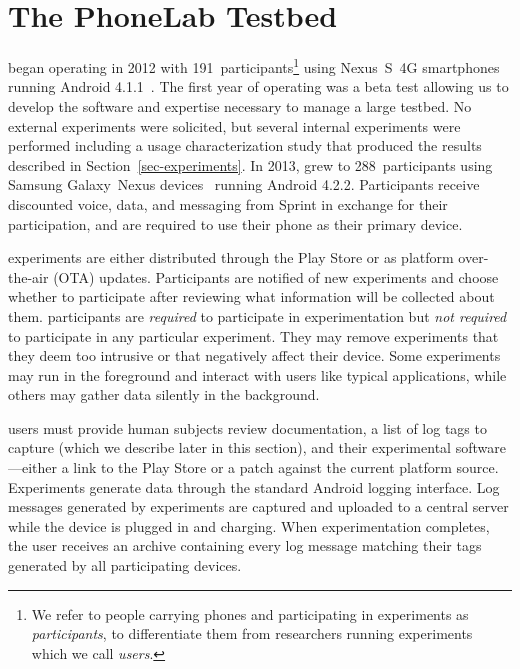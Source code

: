 

\section{The PhoneLab Testbed}
\label{sec-testbed}

\PhoneLab{} began operating in 2012 with 191~participants\footnote{We refer
to people carrying \PhoneLab{} phones and participating in experiments as
\PhoneLab{} \textit{participants}, to differentiate them from researchers
running \PhoneLab{} experiments which we call \textit{users}.} using
Nexus~S~4G smartphones~\cite{nexuss4g} running Android
4.1.1~\cite{jellybean}. The first year of operating was a beta test allowing
us to develop the software and expertise necessary to manage a large testbed.
No external experiments were solicited, but several internal experiments were
performed including a usage characterization study that produced the results
described in Section~\ref{sec-experiments}. In 2013, \PhoneLab{} grew to
288~participants using Samsung Galaxy~Nexus devices~\cite{nexuss4g} running
Android 4.2.2. Participants receive discounted voice, data, and messaging
from Sprint in exchange for their participation, and are required to use
their \PhoneLab{} phone as their primary device.

\PhoneLab{} experiments are either distributed through the Play Store or as
platform over-the-air (OTA) updates. Participants are notified of new
experiments and choose whether to participate after reviewing what
information will be collected about them. \PhoneLab{} participants are
\textit{required} to participate in experimentation but \textit{not required}
to participate in any particular experiment. They may remove experiments that
they deem too intrusive or that negatively affect their device. Some
experiments may run in the foreground and interact with users like typical
applications, while others may gather data silently in the background.

\PhoneLab{} users must provide human subjects review documentation, a list of
log tags to capture (which we describe later in this section), and their
experimental software---either a link to the Play Store or a patch against
the current \PhoneLab{} platform source.  Experiments generate data through
the standard Android logging interface. Log messages generated by \PhoneLab{}
experiments are captured and uploaded to a central server while the device is
plugged in and charging. When experimentation completes, the user receives an
archive containing every log message matching their tags generated by all
participating devices.

